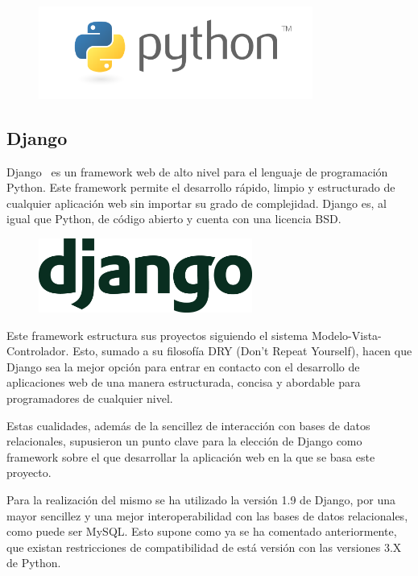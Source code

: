 \documentclass[a4paper, spanish, 12pt]{book}
\begin{document}
\begin{figure}[H]
  \centering
  \includegraphics[width=9cm, keepaspectratio]{img/python-logo}
\end{figure}

\subsection{Django}
\label{subsec:django}

Django~\cite{django} es un framework web de alto nivel para el lenguaje de
programaci\'on Python. Este framework permite el desarrollo r\'apido, limpio y
estructurado de cualquier aplicaci\'on web sin importar su grado de complejidad.
Django es, al igual que Python, de c\'odigo abierto y cuenta con una licencia BSD.

\begin{figure}[H]
  \centering
  \includegraphics[width=7cm, keepaspectratio]{img/django-logo}
\end{figure}

Este framework estructura sus proyectos siguiendo el sistema Modelo-Vista-Controlador.
Esto, sumado a su filosof\'ia DRY (Don't Repeat Yourself), hacen que Django sea
la mejor opci\'on para entrar en contacto con el desarrollo de aplicaciones web
de una manera estructurada, concisa y abordable para programadores de cualquier
nivel.

Estas cualidades, adem\'as de la sencillez de interacci\'on con bases de datos
relacionales, supusieron un punto clave para la elecci\'on de Django como
framework sobre el que desarrollar la aplicaci\'on web en la que se basa este proyecto.

Para la realizaci\'on del mismo se ha utilizado la versi\'on 1.9 de Django, por una
mayor sencillez y una mejor interoperabilidad con las bases de datos relacionales,
como puede ser MySQL. Esto supone como ya se ha comentado anteriormente, que existan
restricciones de compatibilidad de est\'a versi\'on con las versiones 3.X de Python.
\end{document}
